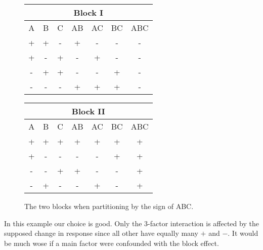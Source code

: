\begin{figure}[H]\centering
    \begin{tabular}{*7c}
        \multicolumn{7}{c}{\textbf{Block I}}\\
        \toprule
        A & B & C & AB & AC & BC & ABC\\
        \midrule
        + & + & - & + & - & - & - \\
        + & - & + & - & + & - & - \\
        - & + & + & - & - & + & - \\
        - & - & - & + & + & + & - \\
        \bottomrule
    \end{tabular}        
        \quad
    \begin{tabular}{*7c}
        \multicolumn{7}{c}{\textbf{Block II}}\\        \toprule
        A & B & C & AB & AC & BC & ABC \\
        \midrule
        + & + & + & + & + & + & + \\
        + & - & - & - & - & + & + \\
        - & - & + & + & - & - & + \\
        - & + & - & - & + & - & + \\
        \bottomrule
    \end{tabular}        
    \caption{The two blocks when partitioning by the sign of ABC.}
\end{figure}

In this example our choice is good. Only the 3-factor interaction is affected by the supposed change in response since all other have equally many $+$ and $-$. It would be much wose if a main factor were confounded with the block effect. 